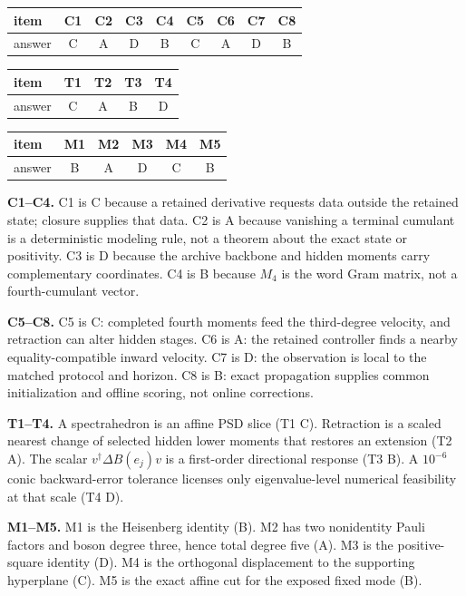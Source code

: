 \documentclass[10pt,letterpaper,twocolumn]{article}
\newcommand{\sectionline}[1]{%
  \Needspace{6\baselineskip}%
  \par\medskip{\color{navy}\large\bfseries #1}\par
  \vspace{-2pt}{\color{navy}\rule{\columnwidth}{0.7pt}}\par\smallskip
}
\begin{document}
\sectionline{Part II --- Exit-quiz key}

\begin{center}
\begin{tabular}{@{}lcccccccc@{}}
\toprule
item & C1&C2&C3&C4&C5&C6&C7&C8\\
\midrule
answer & C&A&D&B&C&A&D&B\\
\bottomrule
\end{tabular}
\end{center}
\begin{center}
\begin{tabular}{@{}lcccc@{}}
\toprule
item & T1&T2&T3&T4\\
\midrule
answer & C&A&B&D\\
\bottomrule
\end{tabular}
\qquad
\begin{tabular}{@{}lccccc@{}}
\toprule
item & M1&M2&M3&M4&M5\\
\midrule
answer & B&A&D&C&B\\
\bottomrule
\end{tabular}
\end{center}

\textbf{C1--C4.}  C1 is C because a retained derivative requests data outside
the retained state; closure supplies that data.  C2 is A because vanishing a
terminal cumulant is a deterministic modeling rule, not a theorem about the
exact state or positivity.  C3 is D because the archive backbone and hidden
moments carry complementary coordinates.  C4 is B because \(M_4\) is the
word Gram matrix, not a fourth-cumulant vector.

\textbf{C5--C8.}  C5 is C: completed fourth moments feed the third-degree
velocity, and retraction can alter hidden stages.  C6 is A: the retained
controller finds a nearby equality-compatible inward velocity.  C7 is D:
the observation is local to the matched protocol and horizon.  C8 is B:
exact propagation supplies common initialization and offline scoring, not
online corrections.

\textbf{T1--T4.}  A spectrahedron is an affine PSD slice (T1 C).  Retraction
is a scaled nearest change of selected hidden lower moments that restores an
extension (T2 A).  The scalar \(v^\dagger\Delta B(e_j)v\) is a first-order
directional response (T3 B).  A \(10^{-6}\) conic backward-error tolerance
licenses only eigenvalue-level numerical feasibility at that scale (T4 D).

\textbf{M1--M5.}  M1 is the Heisenberg identity (B).  M2 has two nonidentity
Pauli factors and boson degree three, hence total degree five (A).  M3 is the
positive-square identity (D).  M4 is the orthogonal displacement to the
supporting hyperplane (C).  M5 is the exact affine cut for the exposed fixed
mode (B).
\end{document}
